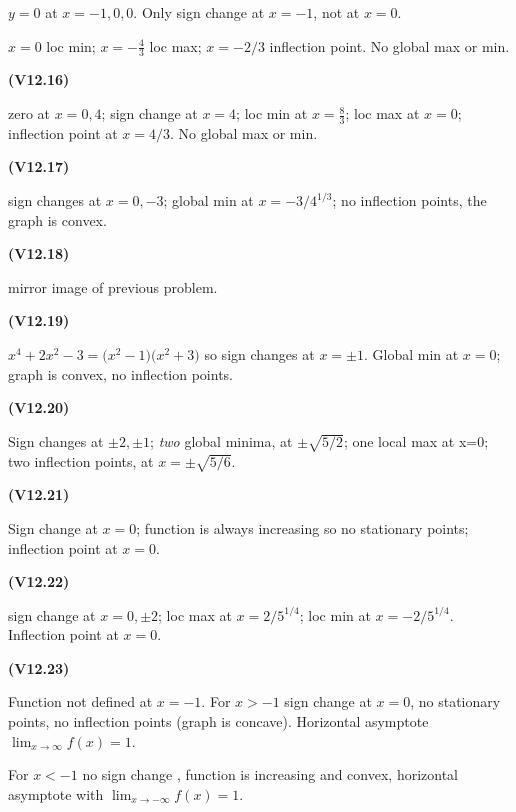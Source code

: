\documentclass[openany,reqno]{amsbook}
\begin{document}
\begin{trivlist}
  $y=0$ at $x=-1, 0, 0$.  Only sign change at $x=-1$, not at $x=0$.

  $x=0$ loc min;  $x=-\frac43$ loc max;  $x=-2/3$ inflection point.
  No global max or min.
  \bigskip

\item[{\bf(V12.16)}]

  zero at $x=0, 4$; sign change at $x=4$; loc min at $x=\frac83$; loc
  max at $x=0$; inflection point at $x=4/3$.  No global max or min.
  \bigskip

\item[{\bf(V12.17)}]

  sign changes at $x=0, -3$;  global min at $x=-3/4^{1/3}$; no inflection
  points, the graph is convex.
  \bigskip

\item[{\bf(V12.18)}]

  mirror image of previous problem.
  \bigskip

\item[{\bf(V12.19)}]

  $x^4+2x^2-3 = \bigl(x^2-1\bigr)\bigl(x^2+3\bigr)$ so sign changes at
  $x=\pm1$.  Global min at $x=0$;  graph is convex, no inflection points.
  \bigskip

\item[{\bf(V12.20)}]

  Sign changes at $\pm2, \pm1$;  \emph{two} global minima, at $\pm\sqrt{5/2}$;
  one local max at x=0;  two inflection points, at $x=\pm\sqrt{5/6}$.
  \bigskip

\item[{\bf(V12.21)}]

  Sign change at $x=0$;  function is always increasing so no stationary
  points;  inflection point at $x=0$.
  \bigskip

\item[{\bf(V12.22)}]

  sign change at $x=0, \pm 2$;  loc max at $x=2/5^{1/4}$; loc min at
  $x=-2/5^{1/4}$. Inflection point at $x=0$.
  \bigskip

\item[{\bf(V12.23)}]

  Function not defined at $x=-1$.  For $x>-1$ sign change at $x=0$, no
  stationary points, no inflection points (graph is concave).
  Horizontal asymptote $\lim_{x\to \infty}f(x) = 1$.

  For $x<-1$ no sign change , function is increasing and convex, horizontal
  asymptote with $\lim_{x\to-\infty}f(x) = 1$.
  \bigskip


\end{trivlist}
\end{document}
